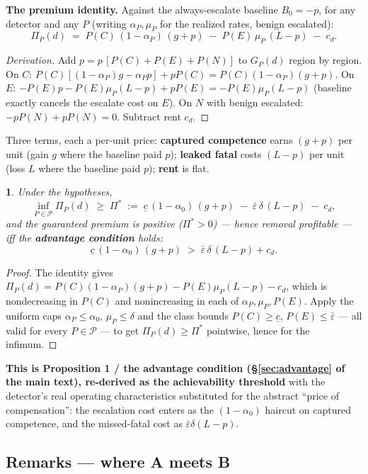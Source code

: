 \documentclass[11pt]{article}
\theoremstyle{plain}
\newtheorem*{namedthminner}{\namedthmname}
\newenvironment{nthm}[1]{\def\namedthmname{#1}\begin{namedthminner}}{\end{namedthminner}}
\theoremstyle{definition}
\begin{document}
\textbf{The premium identity.} Against the always-escalate baseline $B_0 = -p$,
for any detector and any $P$ (writing $\alpha_P, \mu_P$ for the realized
rates, benign escalated):
$$\Pi_P(d) \;=\; P(C)\,(1-\alpha_P)\,(g+p) \;-\; P(E)\,\mu_P\,(L-p) \;-\; c_d.$$

\begin{proof}[Derivation]
Add $p = p\,[P(C)+P(E)+P(N)]$ to $G_P(d)$ region by region. On
$C$: $P(C)[(1-\alpha_P)g - \alpha_P p] + pP(C) = P(C)(1-\alpha_P)(g+p)$. On
$E$: $-P(E)p - P(E)\mu_P(L-p) + pP(E) = -P(E)\mu_P(L-p)$ (baseline exactly
cancels the escalate cost on $E$). On $N$ with benign escalated: $-pP(N) +
pP(N) = 0$. Subtract rent $c_d$.
\end{proof}

Three terms, each a per-unit price: \textbf{captured competence} earns $(g+p)$ per
unit (gain $g$ where the baseline paid $p$); \textbf{leaked fatal} costs $(L-p)$
per unit (loss $L$ where the baseline paid $p$); \textbf{rent} is flat.

\begin{nthm}{Theorem A}
Under the hypotheses,
$$\inf_{P \in \mathcal{P}} \Pi_P(d) \;\geq\; \Pi^* \;:=\; \underline{c}\,(1-\alpha_0)\,(g+p) \;-\; \bar\varepsilon\,\delta\,(L-p) \;-\; c_d,$$
and the guaranteed premium is positive ($\Pi^* > 0$) --- hence removal
profitable --- iff the
\textbf{advantage condition} holds:
$$\underline{c}\,(1-\alpha_0)\,(g+p) \;>\; \bar\varepsilon\,\delta\,(L-p) + c_d.$$
\end{nthm}

\begin{proof}
The identity gives $\Pi_P(d) = P(C)(1-\alpha_P)(g+p) - P(E)\mu_P(L-p)
- c_d$, which is nondecreasing in $P(C)$ and nonincreasing in each of
$\alpha_P, \mu_P, P(E)$. Apply the uniform caps $\alpha_P \leq \alpha_0$,
$\mu_P \leq \delta$ and the class bounds $P(C) \geq \underline c$, $P(E) \leq
\bar\varepsilon$ --- all valid for every $P \in \mathcal{P}$ --- to get
$\Pi_P(d) \geq \Pi^*$ pointwise, hence for the infimum.
\end{proof}

\textbf{This is Proposition 1 / the advantage condition (\S\ref{sec:advantage} of the main text),
re-derived as the achievability threshold} with the detector's real
operating characteristics substituted for the abstract ``price of
compensation'': the escalation cost enters as the $(1-\alpha_0)$ haircut on
captured competence, and the missed-fatal cost as $\bar\varepsilon\delta(L-p)$.

\subsection*{Remarks --- where A meets B}
\end{document}
